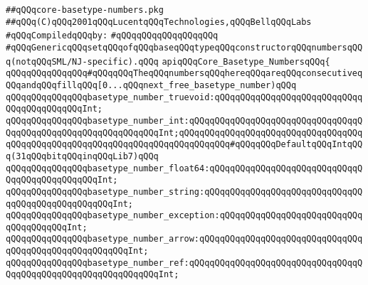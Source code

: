 \label{src/lib/compiler/front/typer-stuff/basics/core-basetype-numbers.pkg}
\verb|##qQQqcore-basetype-numbers.pkg|\newline
\verb|##qQQq(C)qQQq2001qQQqLucentqQQqTechnologies,qQQqBellqQQqLabs|\newline
\newline
\verb|#qQQqCompiledqQQqby:|\newline
\verb|#qQQqqQQqqQQqqQQqqQQq|\newline
\newline
\newline
\newline
\verb|#qQQqGenericqQQqsetqQQqofqQQqbaseqQQqtypeqQQqconstructorqQQqnumbersqQQq(notqQQqSML/NJ-specific).qQQq|\newline
\newline
\newline
\newline
\verb|apiqQQqCore_Basetype_NumbersqQQq{|\newline
\newline
\verb|qQQqqQQqqQQqqQQq#qQQqqQQqTheqQQqnumbersqQQqhereqQQqareqQQqconsecutiveqQQqandqQQqfillqQQq[0...qQQqnext_free_basetype_number)qQQq|\newline
\newline
\verb|qQQqqQQqqQQqqQQqbasetype_number_truevoid:qQQqqQQqqQQqqQQqqQQqqQQqqQQqqQQqqQQqqQQqqQQqInt;|\newline
\verb|qQQqqQQqqQQqqQQqbasetype_number_int:qQQqqQQqqQQqqQQqqQQqqQQqqQQqqQQqqQQqqQQqqQQqqQQqqQQqqQQqqQQqqQQqInt;qQQqqQQqqQQqqQQqqQQqqQQqqQQqqQQqqQQqqQQqqQQqqQQqqQQqqQQqqQQqqQQqqQQqqQQqqQQqqQQq#qQQqqQQqDefaultqQQqIntqQQq(31qQQqbitqQQqinqQQqLib7)qQQq|\newline
\verb|qQQqqQQqqQQqqQQqbasetype_number_float64:qQQqqQQqqQQqqQQqqQQqqQQqqQQqqQQqqQQqqQQqqQQqqQQqInt;|\newline
\verb|qQQqqQQqqQQqqQQqbasetype_number_string:qQQqqQQqqQQqqQQqqQQqqQQqqQQqqQQqqQQqqQQqqQQqqQQqqQQqInt;|\newline
\verb|qQQqqQQqqQQqqQQqbasetype_number_exception:qQQqqQQqqQQqqQQqqQQqqQQqqQQqqQQqqQQqqQQqInt;|\newline
\verb|qQQqqQQqqQQqqQQqbasetype_number_arrow:qQQqqQQqqQQqqQQqqQQqqQQqqQQqqQQqqQQqqQQqqQQqqQQqqQQqqQQqInt;|\newline
\verb|qQQqqQQqqQQqqQQqbasetype_number_ref:qQQqqQQqqQQqqQQqqQQqqQQqqQQqqQQqqQQqqQQqqQQqqQQqqQQqqQQqqQQqqQQqInt;|\newline
